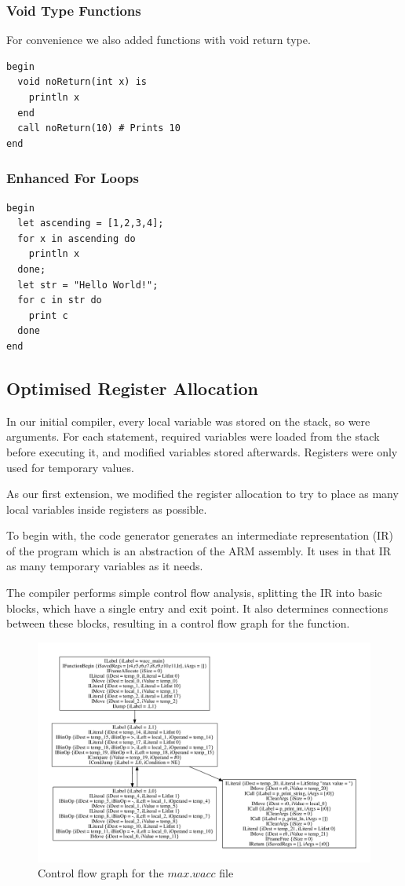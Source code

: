 \documentclass{article}
\begin{document}
\subsubsection{Void Type Functions}
For convenience we also added functions with void return type.
\begin{lstlisting}
begin
  void noReturn(int x) is
    println x
  end
  call noReturn(10) # Prints 10
end
\end{lstlisting}
\subsubsection{Enhanced For Loops}
\begin{lstlisting}
begin
  let ascending = [1,2,3,4];
  for x in ascending do
    println x
  done;
  let str = "Hello World!";
  for c in str do
    print c
  done
end
\end{lstlisting}

\subsection{Optimised Register Allocation}
In our initial compiler, every local variable was stored on the stack, so were arguments. For each statement, required variables were loaded
from the stack before executing it, and modified variables stored afterwards. Registers were only used for temporary values.

As our first extension, we modified the register allocation to try to place as many local variables inside registers as possible.

To begin with, the code generator generates an intermediate representation (IR) of the program which is an abstraction of the ARM assembly.
It uses in that IR as many temporary variables as it needs.

The compiler performs simple control flow analysis, splitting the IR into basic blocks, which have a single entry and exit point. It
also determines connections between these blocks, resulting in a control flow graph for the function.

\begin{figure}
  \centering
  \includegraphics[width=.7\textwidth]{max-cfg.pdf}
  \caption{Control flow graph for the $max.wacc$ file}
\end{figure}
\end{document}
